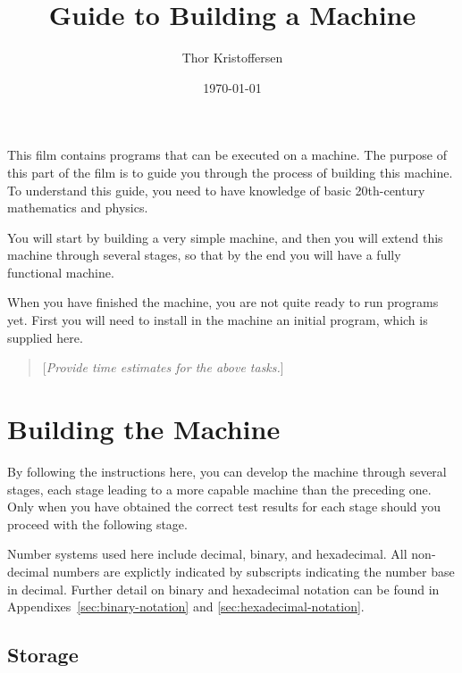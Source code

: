 \documentclass[a4paper,12pt]{article}
\author{Thor Kristoffersen}
\date{\today}
\title{Guide to Building a Machine}
\newcommand{\comment}[1]{\begin{quote}[\textit{#1}]\end{quote}}
\begin{document}
\maketitle

\noindent
This film contains programs that can be executed on a machine.
The purpose of this part of the film is to guide you through the process of building this machine.
To understand this guide, you need to have knowledge of basic 20th-century mathematics and physics.

You will start by building a very simple machine, and then you will extend this machine through several stages, so that by the end you will have a fully functional machine.

When you have finished the machine, you are not quite ready to run programs yet.
First you will need to install in the machine an initial program, which is supplied here.

\comment{Provide time estimates for the above tasks.}

\section{Building the Machine}
\label{sec:building-machine}

By following the instructions here, you can develop the machine through several stages, each stage leading to a more capable machine than the preceding one.
Only when you have obtained the correct test results for each stage should you proceed with the following stage.

Number systems used here include decimal, binary, and hexadecimal.
All non-decimal numbers are explictly indicated by subscripts indicating the number base in decimal.
Further detail on binary and hexadecimal notation can be found in Appendixes~\ref{sec:binary-notation} and \ref{sec:hexadecimal-notation}.

\subsection{Storage}
\end{document}
